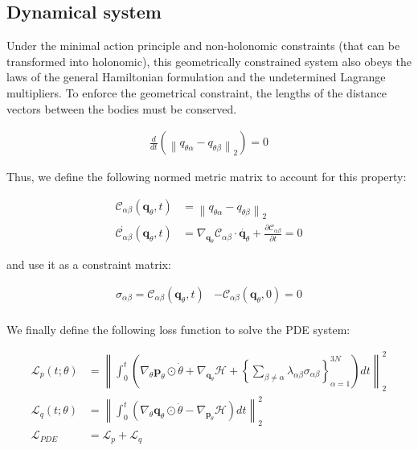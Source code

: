 \documentclass[draft]{agujournal2019}
\newcommand{\norm}[1]{\left\lVert#1\right\rVert}
\begin{document}
\subsection{Dynamical system}
Under the minimal action principle and non-holonomic constraints (that can be transformed into holonomic), this geometrically constrained system also obeys the laws of the general Hamiltonian formulation and the undetermined Lagrange multipliers. To enforce the geometrical constraint, the lengths of the distance vectors between the bodies must be conserved.

\begin{align*}
    \frac{d}{dt} \left( \norm{q_{\theta\alpha} - q_{\theta\beta}}_2\right) = 0
\end{align*}

Thus, we define the following normed metric matrix to account for this property:

\begin{align*}
    \mathcal{C}_{\alpha\beta}(\mathbf{q}_\theta, t) &= \norm{q_{\theta\alpha} - q_{\theta\beta}}_2 \\
    \dot{\mathcal{C}_{\alpha\beta}}\left(\mathbf{q}_\theta, t\right) &= \nabla_{\mathbf{q}_\theta} \mathcal{C}_{\alpha\beta} \cdot \dot{\mathbf{q}_\theta} + \frac{\partial \mathcal{C}_{\alpha\beta}}{\partial t} = 0
\end{align*}

and use it as a constraint matrix:

\begin{align*}
    \sigma_{\alpha\beta} = \mathcal{C}_{\alpha\beta} \left(\mathbf{q}_\theta, t\right) &- \mathcal{C}_{\alpha\beta}\left(\mathbf{q}_\theta, 0\right) = 0 \\
\end{align*}

We finally define the following loss function to solve the PDE system:

\begin{align}
    \mathcal{L}_{p}(t; \theta) &= \norm{\int_0^t \left(\nabla_\theta \mathbf{p}_\theta \odot \dot{\theta} + \nabla_{\mathbf{q}_\theta} \mathcal{H} + \left\{\sum_{\beta\neq\alpha} \lambda_{\alpha\beta}\sigma_{\alpha\beta}\right\}_{\alpha = 1}^{3N}\right) dt}_2^2 \\
    \mathcal{L}_{q}(t; \theta) &= \norm{\int_0^t \left(\nabla_\theta \mathbf{q}_\theta \odot \dot{\theta} - \nabla_{\mathbf{p}_\theta} \mathcal{H}\right) dt}^2_2 \\
    \mathcal{L}_{PDE} &= \mathcal{L}_{p} + \mathcal{L}_{q}
\end{align}
\end{document}
